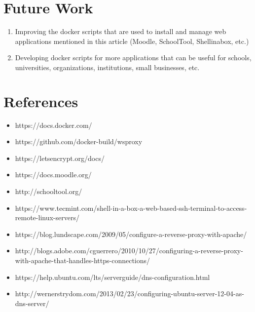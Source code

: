 \documentclass[a4paper]{article}
\begin{document}
\section{Future Work}

\begin{enumerate}
  \item Improving the docker scripts that are used to install and
    manage web applications mentioned in this article (Moodle,
    SchoolTool, Shellinabox, etc.)
  \item Developing docker scripts for more applications that can be
    useful for schools, universities, organizations, institutions,
    small businesses, etc.
\end{enumerate}

\section{References}

\begin{itemize}
  \item https://docs.docker.com/
  \item https://github.com/docker-build/wsproxy
  \item https://letsencrypt.org/docs/
  \item https://docs.moodle.org/
  \item http://schooltool.org/
  \item https://www.tecmint.com/shell-in-a-box-a-web-based-ssh-terminal-to-access-remote-linux-servers/
  \item https://blog.lundscape.com/2009/05/configure-a-reverse-proxy-with-apache/
  \item http://blogs.adobe.com/cguerrero/2010/10/27/configuring-a-reverse-proxy-with-apache-that-handles-https-connections/
  \item https://help.ubuntu.com/lts/serverguide/dns-configuration.html
  \item http://wernerstrydom.com/2013/02/23/configuring-ubuntu-server-12-04-as-dns-server/
\end{itemize}
\end{document}
